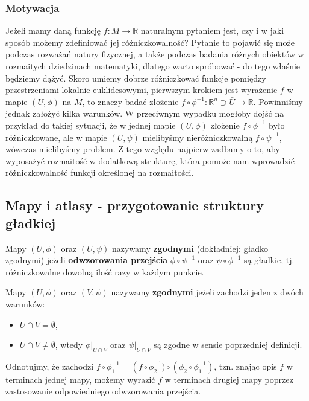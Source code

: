 \subsubsection{Motywacja}
Jeżeli mamy daną funkcję $f : M \to \mathbb{R}$ naturalnym pytaniem jest, czy i w jaki sposób możemy zdefiniować jej różniczkowalność? Pytanie to pojawić się może podczas rozważań natury fizycznej, a także podczas badania różnych obiektów w rozmaitych dziedzinach matematyki, dlatego warto spróbować - do tego właśnie będziemy dążyć. Skoro umiemy dobrze różniczkować funkcje pomiędzy przestrzeniami lokalnie euklidesowymi, pierwszym krokiem jest wyrażenie $f$ w mapie $(U,\phi)$ na $M$, to znaczy badać złożenie $f\circ \phi^{-1} : \mathbb{R}^n \supset \bar{U} \to \mathbb{R}$. Powinniśmy jednak założyć kilka warunków. W przeciwnym wypadku mogłoby dojść na przykład do takiej sytuacji, że w jednej mapie $(U,\phi)$ złożenie $f \circ \phi^{-1}$ było różniczkowane, ale w mapie $(U,\psi)$ mielibyśmy nieróżniczkowalną $f \circ \psi^{-1}$, wówczas mielibyśmy problem. Z tego względu najpierw zadbamy o to, aby wyposażyć rozmaitość w dodatkową strukturę, która pomoże nam wprowadzić różniczkowalność funkcji określonej na rozmaitości.

\subsection{Mapy i atlasy - przygotowanie struktury gładkiej}
\begin{definition}
	Mapy $(U,\phi)$ oraz $(U,\psi)$ nazywamy \textbf{zgodnymi} (dokładniej: gładko zgodnymi) jeżeli \textbf{odwzorowania przejścia} $\phi \circ \psi^{-1}$ oraz $\psi \circ \phi^{-1}$ są gładkie, tj. różniczkowalne dowolną ilość razy w każdym punkcie.
\end{definition}

\begin{definition}
	Mapy $(U,\phi)$ oraz $(V,\psi)$ nazywamy \textbf{zgodnymi} jeżeli zachodzi jeden z dwóch warunków:
	\begin{itemize}
		\item $U\cap V = \emptyset$,
		\item $U\cap V \neq \emptyset$, wtedy $\phi \big|_{U\cap V}$ oraz  $\psi \big|_{U\cap V}$ są zgodne w sensie poprzedniej definicji.
	\end{itemize}
\end{definition}

Odnotujmy, że zachodzi $f \circ \phi_1^{-1} = \left(f \circ \phi_2^{-1}) \circ \left( \phi_2 \circ \phi_1^{-1} \right)$, tzn. znając opis $f$ w terminach jednej mapy, możemy wyrazić $f$ w terminach drugiej mapy poprzez zastosowanie odpowiedniego odwzorowania przejścia.

